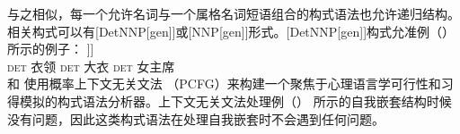 与之相似，每一个允许名词与一个属格名词短语组合的构式语法也允许递归结构。相关构式可以有[DetNNP[gen]]或[NNP[gen]]形式。[DetNNP[gen]]构式允准例（）所示的例子：
\ea
\gll [\sub{NP} des Kragens [\sub{NP} des Mantels [\sub{NP} der Vorsitzenden]]]\\
	{} \textsc{det} 衣领 {} \textsc{det} 大衣 {} \textsc{det} 女主席\\
\z
 \citet{Jurafsky96a}和 \citet*{BLT2009a}使用概率上下文无关文法 （PCFG）来构建一个聚焦于心理语言学可行性和习得模拟的构式语法分析器。上下文无关文法处理例（） 所示的自我嵌套结构时候没有问题，因此这类构式语法在处理自我嵌套时不会遇到任何问题。

